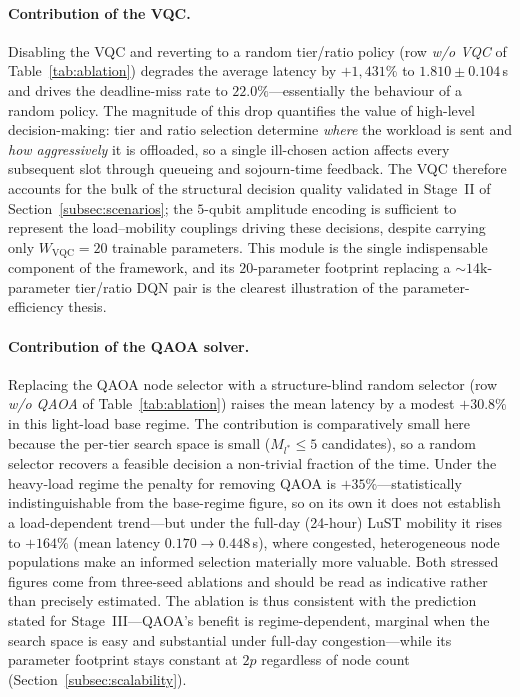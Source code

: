\documentclass[11pt,a4paper]{article}
\theoremstyle{definition}
\begin{document}
\paragraph{Contribution of the VQC.}
Disabling the VQC and reverting to a random tier/ratio policy (row \emph{w/o VQC} of Table~\ref{tab:ablation}) degrades the average latency by $+1{,}431\%$ to $1.810\pm0.104$\,s and drives the deadline-miss rate to $22.0\%$---essentially the behaviour of a random policy. The magnitude of this drop quantifies the value of high-level decision-making: tier and ratio selection determine \emph{where} the workload is sent and \emph{how aggressively} it is offloaded, so a single ill-chosen action affects every subsequent slot through queueing and sojourn-time feedback. The VQC therefore accounts for the bulk of the structural decision quality validated in Stage~II of Section~\ref{subsec:scenarios}; the $5$-qubit amplitude encoding is sufficient to represent the load--mobility couplings driving these decisions, despite carrying only $W_{\mathrm{VQC}}=20$ trainable parameters. This module is the single indispensable component of the framework, and its $20$-parameter footprint replacing a $\sim$$14$k-parameter tier/ratio DQN pair is the clearest illustration of the parameter-efficiency thesis.

\paragraph{Contribution of the QAOA solver.}
Replacing the QAOA node selector with a structure-blind random selector (row \emph{w/o QAOA} of Table~\ref{tab:ablation}) raises the mean latency by a modest $+30.8\%$ in this light-load base regime. The contribution is comparatively small here because the per-tier search space is small ($M_{l^*}\!\leq\!5$ candidates), so a random selector recovers a feasible decision a non-trivial fraction of the time. Under the heavy-load regime the penalty for removing QAOA is $+35\%$---statistically indistinguishable from the base-regime figure, so on its own it does not establish a load-dependent trend---but under the full-day (24-hour) LuST mobility it rises to $+164\%$ (mean latency $0.170\!\rightarrow\!0.448$\,s), where congested, heterogeneous node populations make an informed selection materially more valuable. Both stressed figures come from three-seed ablations and should be read as indicative rather than precisely estimated. The ablation is thus consistent with the prediction stated for Stage~III---QAOA's benefit is regime-dependent, marginal when the search space is easy and substantial under full-day congestion---while its parameter footprint stays constant at $2p$ regardless of node count (Section~\ref{subsec:scalability}).
\end{document}
